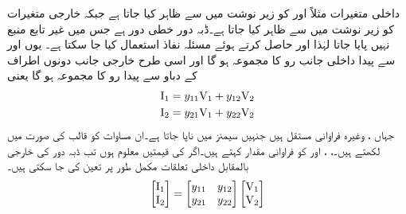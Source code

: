 داخلی متغیرات مثلاً  اور  کو زیر نوشت میں  سے ظاہر کیا جاتا ہے  جبکہ خارجی متغیرات کو زیر نوشت میں  سے ظاہر کیا جاتا ہے۔ڈبہ دور خطی دور ہے جس میں غیر تابع منبع نہیں پایا جاتا لہٰذا  اور  حاصل کرتے ہوئے مسئلہ نفاذ استعمال کیا جا سکتا ہے۔ یوں  اور  سے پیدا داخلی جانب رو کا مجموعہ  ہو گا اور اسی طرح خارجی جانب دونوں اطراف کے دباو سے پیدا رو کا مجموعہ  ہو گا یعنی
\begin{gather}
\begin{aligned}\label{مساوات_نمونہ_الف}
{\ensuremath{{\textup{I}}}}_1&=y_{11}{{\textup{V}}}_1+y_{12}{{\textup{V}}}_2\\
{{\textup{I}}}_2&=y_{21}{{\textup{V}}}_1+y_{22}{{\textup{V}}}_2
\end{aligned}
\end{gather}  
جہاں ،  وغیرہ فراوانی مستقل ہیں جنہیں سیمنز  میں ناپا جاتا ہے۔ان مساوات کو قالب کی صورت میں لکھتے ہیں۔، ،  اور  کو فراوانی مقدار  کہتے ہیں۔اگر  کی قیمتیں معلوم ہوں تب ڈبہ دور کی خارجی بالمقابل داخلی تعلقات مکمل طور پر تعین کی جا سکتی ہیں۔ 
\begin{align}\label{مساوات_نمونہ_ب}
\begin{bmatrix}
{\ensuremath{{\textup{I}}}}_1 \\
{{\textup{I}}}_2
\end{bmatrix}
=
\begin{bmatrix}
y_{11} & y_{12}\\
y_{21} & y_{22}
\end{bmatrix}
\begin{bmatrix}
{\ensuremath{{\textup{V}}}}_1\\
{{\textup{V}}}_2
\end{bmatrix}
\end{align}

